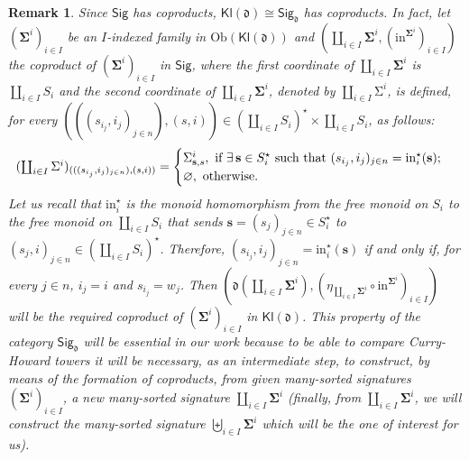 \documentclass{amsart}
\theoremstyle{plain}
\newtheorem{remark}[theorem]{Remark}
\theoremstyle{definition}
\begin{document}
\begin{remark}
	Since $\mathsf{Sig}$ has coproducts, $\mathsf{Kl}(\boldsymbol{\mathfrak{d}})\cong \mathsf{Sig}_{\mathfrak{d}}$ has coproducts. In fact, let $(\mathbf{\Sigma}^{i})_{i\in I}$ be an $I$-indexed family in $\mathrm{Ob}(\mathsf{Kl}(\boldsymbol{\mathfrak{d}}))$ and $(\coprod_{i\in I}\mathbf{\Sigma}^{i},(\mathrm{in}^{\mathbf{\Sigma}^{i}})_{i\in I})$ the coproduct of $(\mathbf{\Sigma}^{i})_{i\in I}$ in $\mathsf{Sig}$, where  the first coordinate of $\coprod_{i\in I}\mathbf{\Sigma}^{i}$ is $\coprod_{i\in I}S_{i}$ and the second coordinate of $\coprod_{i\in I}\mathbf{\Sigma}^{i}$, denoted by $\coprod_{i\in I}\mathrm{\Sigma}^{i}$, is defined, for every $(((s_{i_{j}},i_{j})_{j\in n}),(s,i))\in (\coprod_{i\in I}S_{i})^{\star}\times \coprod_{i\in I}S_{i}$, as follows: 
	\begin{equation*}
		\textstyle
		(\coprod_{i\in I}\mathrm{\Sigma}^{i})_{(((s_{i_{j}},i_{j})_{j\in n}),(s,i))} = 
		\begin{cases}
			\Sigma^{i}_{\mathbf{s},s}, \text{\,\,if $\exists\,\mathbf{s}\in S_{i}^{\star}$ such that $(s_{i_{j}},i_{j})_{j\in n} = \mathrm{in}_{i}^{\star}(\mathbf{s})$;}\\
			\varnothing, \text{\,\,otherwise}.
		\end{cases}
	\end{equation*}
	Let us recall that $\mathrm{in}_{i}^{\star}$ is the monoid homomorphism from the free monoid on $S_{i}$ to the free monoid on $\coprod_{i\in I}S_{i}$ that sends $\mathbf{s} = (s_{j})_{j\in n}\in S_{i}^{\star}$ to 
	$(s_{j},i)_{j\in n}\in (\coprod_{i\in I}S_{i})^{\star}$. Therefore, 
	$(s_{i_{j}},i_{j})_{j\in n} = \mathrm{in}_{i}^{\star}(\mathbf{s})$ if and only if, for every $j\in n$, $i_{j} = i$ and $s_{i_{j}} = w_{j}$.
	Then $(\boldsymbol{\mathfrak{d}}(\coprod_{i\in I}\mathbf{\Sigma}^{i}),(\eta_{\coprod_{i\in I}\mathbf{\Sigma}^{i}}\circ \mathrm{in}^{\mathbf{\Sigma}^{i}})_{i\in I})$ will be the required coproduct of $(\mathbf{\Sigma}^{i})_{i\in I}$ in $\mathsf{Kl}(\boldsymbol{\mathfrak{d}})$. This property of the category $\mathsf{Sig}_{\mathfrak{d}}$ will be essential in our work because to be able to compare Curry-Howard towers it will be necessary, as an intermediate step, to construct, by means of the formation of coproducts, from given many-sorted  signatures $(\mathbf{\Sigma}^{i})_{i\in I}$, a new many-sorted signature $\coprod_{i\in I}\mathbf{\Sigma}^{i}$ (finally, from $\coprod_{i\in I}\mathbf{\Sigma}^{i}$, we will construct the many-sorted signature $\biguplus_{i\in I}\mathbf{\Sigma}^{i}$ which will be the one of interest for us).
	

\end{remark}
\end{document}
